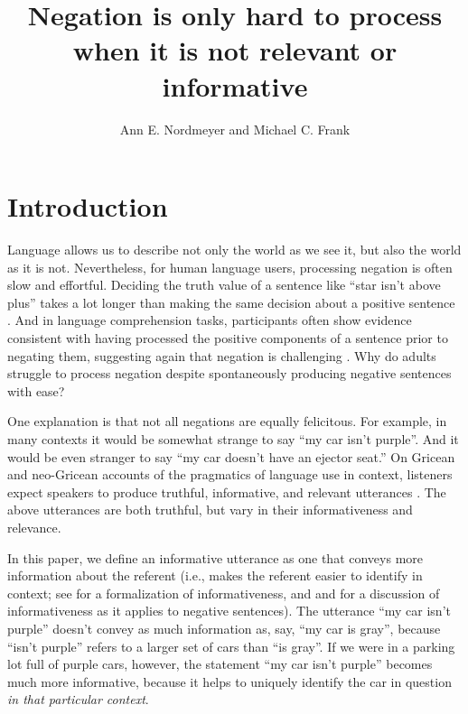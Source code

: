 \documentclass[man, noapacite]{apa2}
\title{Negation is only hard to process when it is not relevant or informative}
\author{Ann E. Nordmeyer and Michael C. Frank}
\affiliation{Department of Psychology, Stanford University \\ 
Corresponding author: Ann E. Nordmeyer \\
Department of Psychology \\
Stanford University \\
Building 420 (Jordan Hall) \\
450 Serra Mall \\
Stanford, CA 94305 \\
Phone: 650-721-9270 \\
Email: anordmey@stanford.edu }
\begin{document}
\maketitle

\section{Introduction}

Language allows us to describe not only the world as we see it, but also the world as it is not. Nevertheless, for human language users, processing negation is often slow and effortful. Deciding the truth value of a sentence like ``star isn't above plus''  takes a lot longer than making the same decision about a positive sentence \cite{hclark1972, carpenter1975, just1971, just1976}. And in language comprehension tasks, participants often show evidence consistent with having processed the positive components of a sentence prior to negating them, suggesting again that negation is challenging \cite{kaup2003, kaup2006, hasson2006, fischler1983, ludtke2008, ferguson2008}. Why do adults struggle to process negation despite spontaneously producing negative sentences with ease?

One explanation is that not all negations are equally felicitous. For example, in many contexts it would be somewhat strange to say ``my car isn't purple''.  And it would be even stranger to say ``my car doesn't have an ejector seat.''  On Gricean and neo-Gricean accounts of the pragmatics of language use in context, listeners expect speakers to produce truthful, informative, and relevant utterances \cite{grice1975, horn1984, levinson2000, sperber1986}. The above utterances are both truthful, but vary in their informativeness and relevance. 

In this paper, we define an informative utterance as one that conveys more information about the referent (i.e., makes the referent easier to identify in context; see  for a formalization of informativeness, and  and  for a discussion of informativeness as it applies to negative sentences). The utterance ``my car isn't purple'' doesn't convey as much information as, say, ``my car is gray'', because ``isn't purple'' refers to a larger set of cars than ``is gray''. If we were in a parking lot full of purple cars, however, the statement ``my car isn't purple'' becomes much more informative, because it helps to uniquely identify the car in question \emph{in that particular context}. 
\end{document}
